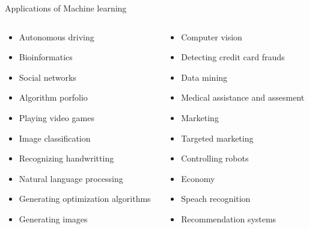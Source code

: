 \documentclass[aspectratio=169]{beamer}
\begin{document}
\begin{frame}{Applications of Machine learning}
    \begin{columns}
    \begin{column}{0.5\textwidth}
        \begin{itemize}
            \item Autonomous driving
            \item Bioinformatics
            \item Social networks
            \item Algorithm porfolio
            \item Playing video games
            \item Image classification
            \item Recognizing handwritting
            \item Natural language processing
            \item Generating optimization algorithms \cite{learning-to-learn}
            \item Generating images
        \end{itemize}
    \end{column}
    \begin{column}{0.5\textwidth}  %
        \begin{itemize}
            \item Computer vision
            \item Detecting credit card frauds
            \item Data mining
            \item Medical assistance and assesment
            \item Marketing
            \item Targeted marketing
            \item Controlling robots
            \item Economy
            \item Speach recognition
            \item Recommendation systems
        \end{itemize}
    \end{column}
    \end{columns}
\end{frame}
\end{document}
